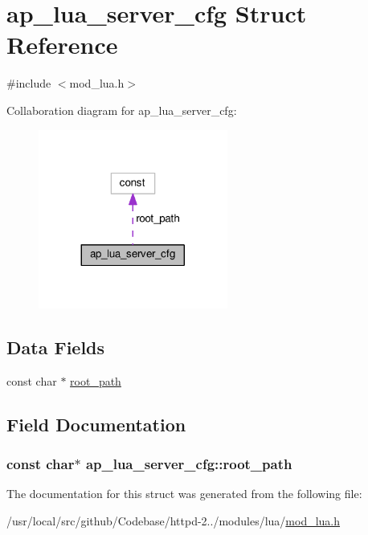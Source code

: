 \hypertarget{structap__lua__server__cfg}{}\section{ap\+\_\+lua\+\_\+server\+\_\+cfg Struct Reference}
\label{structap__lua__server__cfg}


{\ttfamily \#include $<$mod\+\_\+lua.\+h$>$}



Collaboration diagram for ap\+\_\+lua\+\_\+server\+\_\+cfg\+:
\nopagebreak
\begin{figure}[H]
\begin{center}
\leavevmode
\includegraphics[width=176pt]{structap__lua__server__cfg__coll__graph}
\end{center}
\end{figure}
\subsection*{Data Fields}
\begin{DoxyCompactItemize}
\item 
const char $\ast$ \hyperlink{structap__lua__server__cfg_ab72e672f0b54fc482e91fc7852bf2b00}{root\+\_\+path}
\end{DoxyCompactItemize}


\subsection{Field Documentation}
\subsubsection[{\texorpdfstring{root\+\_\+path}{root_path}}]{\setlength{\rightskip}{0pt plus 5cm}const char$\ast$ ap\+\_\+lua\+\_\+server\+\_\+cfg\+::root\+\_\+path}\hypertarget{structap__lua__server__cfg_ab72e672f0b54fc482e91fc7852bf2b00}{}\label{structap__lua__server__cfg_ab72e672f0b54fc482e91fc7852bf2b00}


The documentation for this struct was generated from the following file\+:\begin{DoxyCompactItemize}
\item 
/usr/local/src/github/\+Codebase/httpd-\/2../modules/lua/\hyperlink{mod__lua_8h}{mod\+\_\+lua.\+h}\end{DoxyCompactItemize}
